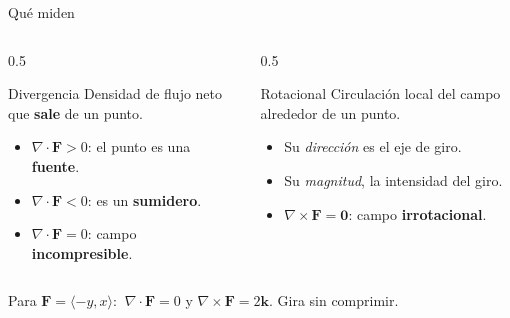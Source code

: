 \documentclass[11pt,aspectratio=169]{beamer}
\begin{document}
\begin{frame}{Qué miden}
  \begin{columns}
    \begin{column}{0.5\textwidth}
      \begin{block}{Divergencia}
        Densidad de flujo neto que \textbf{sale} de un punto.
        \begin{itemize}\small
          \item $\nabla\cdot\mathbf F>0$: el punto es una \textbf{fuente}.
          \item $\nabla\cdot\mathbf F<0$: es un \textbf{sumidero}.
          \item $\nabla\cdot\mathbf F=0$: campo \textbf{incompresible}.
        \end{itemize}
      \end{block}
    \end{column}
    \begin{column}{0.5\textwidth}
      \begin{block}{Rotacional}
        Circulación local del campo alrededor de un punto.
        \begin{itemize}\small
          \item Su \emph{dirección} es el eje de giro.
          \item Su \emph{magnitud}, la intensidad del giro.
          \item $\nabla\times\mathbf F=\mathbf 0$: campo \textbf{irrotacional}.
        \end{itemize}
      \end{block}
    \end{column}
  \end{columns}
  \vspace{6pt}
  \pause
  \begin{center}
  \normalsize\color{tealx} Para $\mathbf F=\langle -y,x\rangle$: $\ \nabla\cdot\mathbf F = 0$ y $\nabla\times\mathbf F = 2\mathbf k$. Gira sin comprimir.
  \end{center}
  \pause
\end{frame}

\end{document}
